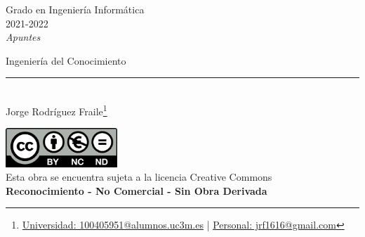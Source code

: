 \documentclass[12pt, twoside, openright]{report} %
\begin{document}

\begin{titlepage}
  \begin{sffamily}
    \color{azulUC3M}
    \begin{center}
      \begin{figure}[H] %
      \end{figure}
      \vspace{2.5cm}
      \begin{Large}
        Grado en Ingeniería Informática\\
        2021-2022\\
        \vspace{2cm}
        \textsl{Apuntes}\\
        \bigskip
      \end{Large}
      {\Huge Ingeniería del Conocimiento}\\
      \vspace*{0.5cm}
      \rule{10.5cm}{0.1mm}\\
      \vspace*{0.9cm}
      {\LARGE Jorge Rodríguez Fraile\footnote{\href{mailto:100405951@alumnos.uc3m.es}{Universidad: 100405951@alumnos.uc3m.es}  |  \href{mailto:jrf1616@gmail.com}{Personal: jrf1616@gmail.com}}}\\
      \vspace*{1cm}
    \end{center}
    \vfill
    \color{black}
    \includegraphics[width=4.2cm]{img/creativecommons.png}\\
    Esta obra se encuentra sujeta a la licencia Creative Commons\\ \textbf{Reconocimiento - No Comercial - Sin Obra Derivada}
  \end{sffamily}
\end{titlepage}

\end{document}
